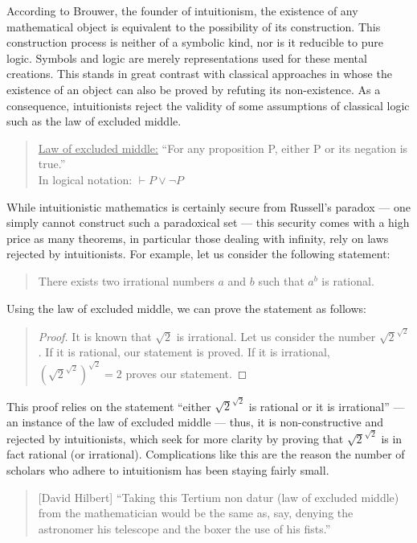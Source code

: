 \documentclass[hidelinks]{article}
\begin{document}
According to Brouwer, the founder of intuitionism, the existence of any mathematical object is equivalent to the possibility of its construction. 
This construction process is neither of a symbolic kind, nor is it reducible to pure logic. Symbols and logic are merely representations used for these mental creations. 
This stands in great contrast with classical approaches in whose the existence of an object can also be proved by refuting its non-existence. As a consequence, intuitionists reject the validity of some assumptions of classical logic such as the law of excluded middle.
\begin{quote}
\underline{Law of excluded middle:} ``For any proposition P, either P or its negation is true.''\\ 
In logical notation: $\vdash P\lor\lnot P$
\end{quote}
While intuitionistic mathematics is certainly secure from Russell's paradox --- one simply cannot construct such a paradoxical set --- this security comes with a high price as many theorems, in particular those dealing with infinity, rely on laws rejected by intuitionists. For example, let us consider the following statement:
\begin{quote}
There exists two irrational numbers $a$ and $b$ such that $a^b$ is rational.
\end{quote}
Using the law of excluded middle, we can prove the statement as follows:
\begin{quote}
\begin{proof}
	It is known that $\sqrt{2}$ is irrational. Let us consider the number $\sqrt{2}^{\sqrt{2}}$. If it is rational, our statement is proved. If it is irrational, $(\sqrt{2}^{\sqrt{2}})^{\sqrt{2}}=2$ proves our statement.
\end{proof}
\end{quote}
This proof relies on the statement ``either $\sqrt{2}^{\sqrt{2}}$ is rational or it is irrational'' --- an instance of the law of excluded middle --- thus, it is non-constructive and rejected by intuitionists, which seek for more clarity by proving that $\sqrt{2}^{\sqrt{2}}$ is in fact rational (or irrational). Complications like this are the reason the number of scholars who adhere to intuitionism has been staying fairly small.

\begin{quote}[David Hilbert]
``Taking this Tertium non datur (law of excluded middle) from the mathematician would be the same as, say, denying the astronomer his telescope and the boxer the use of his fists.''\cite{hilbert_tertium_non_datur}
\end{quote}
\end{document}
